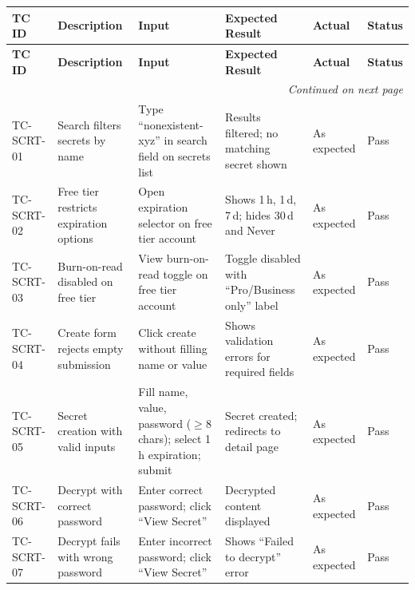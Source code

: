 \documentclass[12pt,a4paper]{article}
\begin{document}
{\footnotesize
\begin{longtable}{@{}p{1.4cm}p{2.6cm}p{3.3cm}p{3.8cm}p{1.4cm}p{0.8cm}@{}}
  \toprule
  \textbf{TC ID} & \textbf{Description} & \textbf{Input} & \textbf{Expected Result} & \textbf{Actual} & \textbf{Status} \\
  \midrule
  \endfirsthead
  \toprule
  \textbf{TC ID} & \textbf{Description} & \textbf{Input} & \textbf{Expected Result} & \textbf{Actual} & \textbf{Status} \\
  \midrule
  \endhead
  \hline
  \multicolumn{6}{r}{\textit{Continued on next page}} \\
  \endfoot
  \bottomrule
  \endlastfoot

  TC-SCRT-01 &
  Search filters secrets by name &
  Type ``nonexistent-xyz'' in search field on secrets list &
  Results filtered; no matching secret shown &
  As expected &
  Pass \\
  \hline

  TC-SCRT-02 &
  Free tier restricts expiration options &
  Open expiration selector on free tier account &
  Shows 1\,h, 1\,d, 7\,d; hides 30\,d and Never &
  As expected &
  Pass \\
  \hline

  TC-SCRT-03 &
  Burn-on-read disabled on free tier &
  View burn-on-read toggle on free tier account &
  Toggle disabled with ``Pro/Business only'' label &
  As expected &
  Pass \\
  \hline

  TC-SCRT-04 &
  Create form rejects empty submission &
  Click create without filling name or value &
  Shows validation errors for required fields &
  As expected &
  Pass \\
  \hline

  TC-SCRT-05 &
  Secret creation with valid inputs &
  Fill name, value, password ($\geq$8 chars); select 1\,h expiration; submit &
  Secret created; redirects to detail page &
  As expected &
  Pass \\
  \hline

  TC-SCRT-06 &
  Decrypt with correct password &
  Enter correct password; click ``View Secret'' &
  Decrypted content displayed &
  As expected &
  Pass \\
  \hline

  TC-SCRT-07 &
  Decrypt fails with wrong password &
  Enter incorrect password; click ``View Secret'' &
  Shows ``Failed to decrypt'' error &
  As expected &
  Pass \\
  \hline


\end{longtable}}
\end{document}
